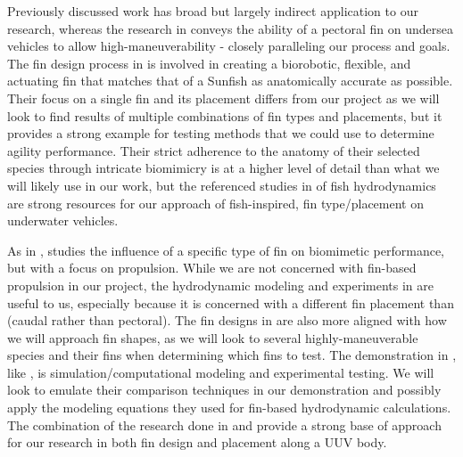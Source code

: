 \documentclass{IEEEtran}
\begin{document}
Previously discussed work has broad but largely indirect application to our research, whereas the research in \cite{berenice2018splash} conveys the ability of a pectoral fin on undersea vehicles to allow high-maneuverability - closely paralleling our process and goals. The fin design process in \cite{berenice2018splash} is involved in creating a biorobotic, flexible, and actuating fin that matches that of a Sunfish as anatomically accurate as possible. Their focus on a single fin and its placement differs from our project as we will look to find results of multiple combinations of fin types and placements, but it provides a strong example for testing methods that we could use to determine agility performance. Their strict adherence to the anatomy of their selected species through intricate biomimicry is at a higher level of detail than what we will likely use in our work, but the referenced studies in \cite{berenice2018splash} of fish hydrodynamics are strong resources for our approach of fish-inspired, fin type/placement on underwater vehicles.

As in \cite{berenice2018splash}, \cite{orourke2020navy} studies the influence of a specific type of fin on biomimetic performance, but with a focus on propulsion. While we are not concerned with fin-based propulsion in our project, the hydrodynamic modeling and experiments in \cite{orourke2020navy} are useful to us, especially because it is concerned with a different fin placement than \cite{berenice2018splash} (caudal rather than pectoral). The fin designs in \cite{orourke2020navy} are also more aligned with how we will approach fin shapes, as we will look to several highly-maneuverable species and their fins when determining which fins to test. The demonstration in \cite{orourke2020navy}, like \cite{noaa2009how}, is simulation/computational modeling and experimental testing. We will look to emulate their comparison techniques in our demonstration and possibly apply the modeling equations they used for fin-based hydrodynamic calculations. The combination of the research done in \cite{berenice2018splash} and \cite{orourke2020navy} provide a strong base of approach for our research in both fin design and placement along a UUV body.
\end{document}
